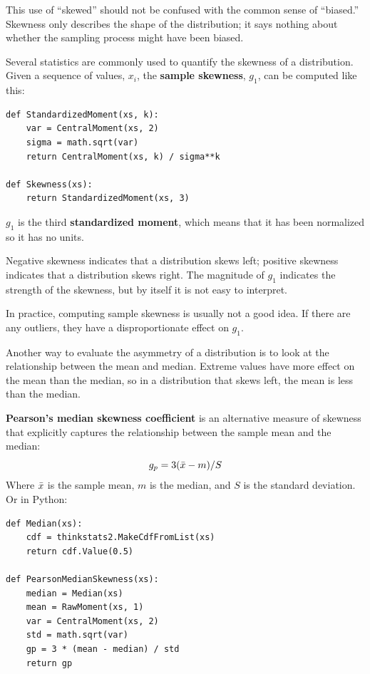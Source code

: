 \documentclass[12pt]{book}
\begin{document}
This use of ``skewed'' should not be confused with the common sense
of ``biased.''  Skewness only describes the shape of the distribution;
it says nothing about whether the sampling process might have been
biased.

Several statistics are commonly used to quantify the skewness of a
distribution.  Given a sequence of values, $x_i$, the {\bf sample
  skewness}, $g_1$, can be computed like this:

\begin{verbatim}
def StandardizedMoment(xs, k):
    var = CentralMoment(xs, 2)
    sigma = math.sqrt(var)
    return CentralMoment(xs, k) / sigma**k

def Skewness(xs):
    return StandardizedMoment(xs, 3)
\end{verbatim}

$g_1$ is the third {\bf standardized moment}, which means that it has
been normalized so it has no units.

Negative skewness indicates that a distribution 
skews left; positive skewness indicates
that a distribution skews right.  The magnitude of $g_1$ indicates
the strength of the skewness, but by itself it is not easy to
interpret.

In practice, computing sample skewness is usually not
a good idea.  If there are any outliers, they
have a disproportionate effect on $g_1$.

Another way to evaluate the asymmetry of a distribution is to look
at the relationship between the mean and median.
Extreme values have more effect on the mean than the median, so
in a distribution that skews left, the mean is less than the median.

{\bf Pearson's median skewness coefficient} is an alternative measure
of skewness that explicitly captures the relationship between the
sample mean and the median:
%
\[ g_p = 3 (\bar{x} - m) / S \]
%
Where $\bar{x}$ is the sample mean, $m$ is the median, and
$S$ is the standard deviation.  Or in Python:

\begin{verbatim}
def Median(xs):
    cdf = thinkstats2.MakeCdfFromList(xs)
    return cdf.Value(0.5)

def PearsonMedianSkewness(xs):
    median = Median(xs)
    mean = RawMoment(xs, 1)
    var = CentralMoment(xs, 2)
    std = math.sqrt(var)
    gp = 3 * (mean - median) / std
    return gp
\end{verbatim}
\end{document}
